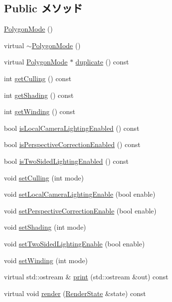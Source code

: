 \subsection*{Public メソッド}
\begin{CompactItemize}
\item 
\hyperlink{classm3g_1_1PolygonMode_b089ee808cbc4799bb2e92dd4ca554c3}{PolygonMode} ()
\item 
virtual \hyperlink{classm3g_1_1PolygonMode_64ea3958d7ec67fc648707782b2221fe}{$\sim$PolygonMode} ()
\item 
virtual \hyperlink{classm3g_1_1PolygonMode}{PolygonMode} $\ast$ \hyperlink{classm3g_1_1PolygonMode_a302cb097523e044bc03198ec8448c32}{duplicate} () const 
\item 
int \hyperlink{classm3g_1_1PolygonMode_3b0c0325e93774222d828f2612d59b1b}{getCulling} () const 
\item 
int \hyperlink{classm3g_1_1PolygonMode_c09a62f099e07df16a8c21f997b9f6a6}{getShading} () const 
\item 
int \hyperlink{classm3g_1_1PolygonMode_6000aac10def51a7c7f12e1381bce19d}{getWinding} () const 
\item 
bool \hyperlink{classm3g_1_1PolygonMode_b8db417fcee613ac80e84087046930cd}{isLocalCameraLightingEnabled} () const 
\item 
bool \hyperlink{classm3g_1_1PolygonMode_76ec871d6ed45e6e6a8822f5c45c828b}{isPerspectiveCorrectionEnabled} () const 
\item 
bool \hyperlink{classm3g_1_1PolygonMode_e7b9f0464063485b025f11a310bb0b80}{isTwoSidedLightingEnabled} () const 
\item 
void \hyperlink{classm3g_1_1PolygonMode_55b3fc23392376c00748d68bdf44ca60}{setCulling} (int mode)
\item 
void \hyperlink{classm3g_1_1PolygonMode_232d4cff53e6fc4863e144dc61e9465c}{setLocalCameraLightingEnable} (bool enable)
\item 
void \hyperlink{classm3g_1_1PolygonMode_81003e409298c3247ab2fed98a7270e9}{setPerspectiveCorrectionEnable} (bool enable)
\item 
void \hyperlink{classm3g_1_1PolygonMode_ebd2bc289af0e5cbee5ea29cbc55ba5a}{setShading} (int mode)
\item 
void \hyperlink{classm3g_1_1PolygonMode_8687b0d3016a777d32e7ebfa1ffd45aa}{setTwoSidedLightingEnable} (bool enable)
\item 
void \hyperlink{classm3g_1_1PolygonMode_5535581a651835a0da246b5936c2f0b5}{setWinding} (int mode)
\item 
virtual std::ostream \& \hyperlink{classm3g_1_1PolygonMode_6fea17fa1532df3794f8cb39cb4f911f}{print} (std::ostream \&out) const 
\item 
virtual void \hyperlink{classm3g_1_1PolygonMode_8babc8a79b78615da51161e94029eea9}{render} (\hyperlink{structm3g_1_1RenderState}{RenderState} \&state) const 
\end{CompactItemize}

